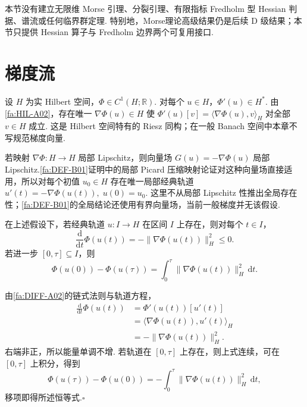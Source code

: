 \begin{FARemark}
本节没有建立无限维 Morse 引理、分裂引理、有限指标 Fredholm 型 Hessian 判据、谱流或任何临界群定理. 特别地，Morse理论高级结果仍是后续 D 级结果；本节只提供 Hessian 算子与 Fredholm 边界两个可复用接口.
\end{FARemark}

\section{梯度流}\label{sec:iii11-gradient-flow}

设 \(\displaystyle H\) 为实 Hilbert 空间，\(\displaystyle\Phi\in C^1(H;\mathbb R)\). 对每个 \(\displaystyle u\in H\)，\(\displaystyle\Phi'(u)\in H^*\). 由\autoref{fa:HIL-A02}，存在唯一 \(\displaystyle\nabla\Phi(u)\in H\) 使
\(\displaystyle \Phi'(u)[v] = \langle\nabla\Phi(u),v\rangle_H\)
对全部 \(\displaystyle v\in H\) 成立. 这是 Hilbert 空间特有的 Riesz 同构；在一般 Banach 空间中本章不写规范梯度向量.

若映射 \(\displaystyle\nabla\Phi:H\to H\) 局部 Lipschitz，则向量场 \(\displaystyle G(u)=-\nabla\Phi(u)\) 局部 Lipschitz.\autoref{fa:DEF-B01}证明中的局部 Picard 压缩映射论证对这种向量场直接适用，所以对每个初值 \(\displaystyle u_0\in H\) 存在唯一局部经典轨道
\(\displaystyle u'(t)=-\nabla\Phi(u(t)), \; u(0)=u_0\).
这里不从局部 Lipschitz 性推出全局存在性；\autoref{fa:DEF-B01}的全局结论还使用有界向量场，当前一般梯度并无该假设.

\begin{FARemark}[局部梯度流能量恒等式]\label{iii11:gradient-energy-local}
在上述假设下，若经典轨道 \(\displaystyle u:I\to H\) 在区间 \(\displaystyle I\) 上存在，则对每个 \(\displaystyle t\in I\)，
\[
\frac{\mathrm{d}}{\mathrm{d}t}\Phi(u(t))
=
-\|\nabla\Phi(u(t))\|_H^2
\leqslant0.
\]
若进一步 \(\displaystyle[0,\tau]\subseteq I\)，则
\[
\Phi(u(0))-\Phi(u(\tau))
=
\int_0^\tau\|\nabla\Phi(u(t))\|_H^2\,\mathrm{d}t.
\]
\end{FARemark}

\begin{FAProof}
由\autoref{fa:DIFF-A02}的链式法则与轨道方程，
\[
\begin{aligned}
\displaystyle \frac{\mathrm{d}}{\mathrm{d}t}\Phi(u(t))
&=\displaystyle \Phi'(u(t))[u'(t)]\\[6pt]
&=\displaystyle \langle\nabla\Phi(u(t)),u'(t)\rangle_H\\
&=-\displaystyle \|\nabla\Phi(u(t))\|_H^2.
\end{aligned}
\]
右端非正，所以能量单调不增. 若轨道在 \(\displaystyle[0,\tau]\) 上存在，则上式连续，可在 \(\displaystyle[0,\tau]\) 上积分，得到
\[
\Phi(u(\tau))-\Phi(u(0))
=
-\int_0^\tau\|\nabla\Phi(u(t))\|_H^2\,\mathrm{d}t,
\]
移项即得所述恒等式.\hfill\(\square\)
\end{FAProof}

